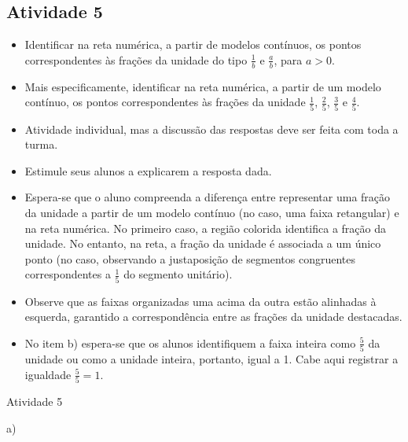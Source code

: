 \begin{multicols}{2}
\subsection{Atividade 5}

\begin{itemize} %
    \item       Identificar na reta numérica, a partir de modelos contínuos, os pontos correspondentes às frações da unidade do tipo       $\frac{1}{b}$       e       $\frac{a}{b}$, para       $a>0$.
    \item       Mais especificamente, identificar na reta numérica, a partir de um modelo contínuo, os pontos correspondentes às frações da unidade       $\frac{1}{5}$,       $\frac{2}{5}$,       $\frac{3}{5}$       e       $\frac{4}{5}$.
\end{itemize} %
  
      
\begin{itemize} %
    \item       Atividade individual, mas a discussão das respostas deve ser feita com toda a turma.
    \item       Estimule seus alunos a explicarem a resposta dada.  
    \item       Espera-se que o aluno compreenda a diferença entre representar uma fração da unidade a partir de um modelo contínuo (no caso, uma faixa retangular) e na reta numérica. No primeiro caso, a região colorida identifica a fração da unidade. No entanto, na reta, a fração da unidade é associada a um único ponto (no caso, observando a justaposição de segmentos congruentes correspondentes a       $\frac{1}{5}$       do segmento unitário). 
    \item       Observe que as faixas organizadas uma acima da outra estão alinhadas à esquerda, garantido a correspondência entre as frações da unidade destacadas. 
    \item       No item b) espera-se que os alunos identifiquem a faixa inteira como       $\frac{5}{5}$       da unidade ou como a unidade inteira, portanto, igual a 1. Cabe aqui registrar a igualdade       $\frac{5}{5}=1$. 
\end{itemize} %
  

\begin{resposta*}{Atividade 5}

\noindent a)
\begin{center}
\end{center}
\end{resposta*}
\end{multicols}

